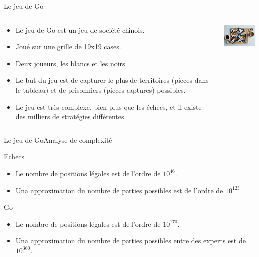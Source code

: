 \begin{frame}{Le jeu de Go}
    \begin{block}{}
        \begin{columns}
            \begin{column}{8cm}
                \begin{itemize}
                    \item Le jeu de Go est un jeu de société chinois.
                    \item Joué sur une grille de 19x19 cases.
                    \item Deux joueurs, les blancs et les noirs.
                    \item Le but du jeu est de capturer le plus de territoires (pieces dans le tableau) et de prisonniers (pieces captures) possibles.
                    \item Le jeu est très complexe, bien plus que les échecs, et il existe des milliers de stratégies différentes.
                \end{itemize}
            \end{column}
            \begin{column}{3cm}
                \includegraphics[width=3cm]{ressources/Go_tableau}
            \end{column}
        \end{columns}
    \end{block}
\end{frame}


\begin{frame}{Le jeu de Go}{Analyse de complexité}
    \begin{block}{Echecs}
        \begin{itemize}
            \item Le nombre de positions légales est de l'ordre de $10^{46}$.
            \item Una approximation du nombre de parties possibles est de l'ordre de $10^{123}$.
        \end{itemize}
    \end{block}
    \begin{alertblock}{Go}
        \begin{itemize}
            \item Le nombre de positions légales est de l'ordre de $10^{170}$.
            \item Una approximation du nombre de parties possibles entre des experts est de $10^{360}$.
        \end{itemize}
    \end{alertblock}
\end{frame}

